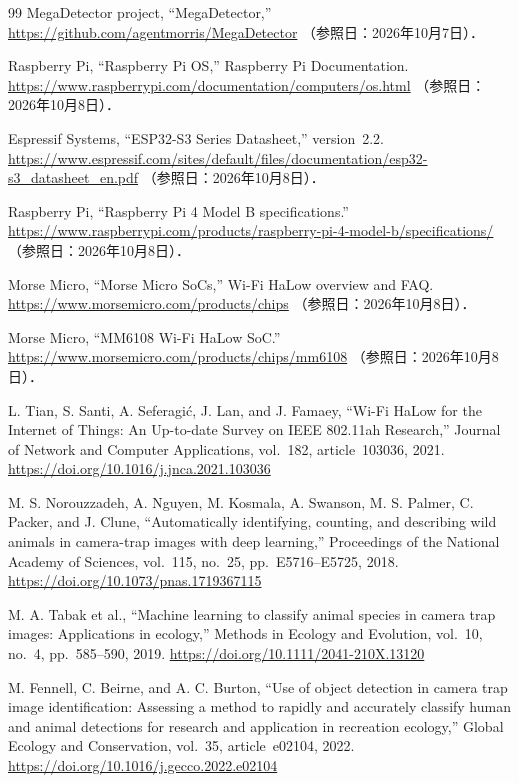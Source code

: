 \begin{thebibliography}{99}
  MegaDetector project, ``MegaDetector,''
  \url{https://github.com/agentmorris/MegaDetector}
  （参照日：2026年10月7日）．

  Raspberry Pi, ``Raspberry Pi OS,'' Raspberry Pi Documentation.
  \url{https://www.raspberrypi.com/documentation/computers/os.html}
  （参照日：2026年10月8日）．

  Espressif Systems, ``ESP32-S3 Series Datasheet,'' version~2.2.
  \url{https://www.espressif.com/sites/default/files/documentation/esp32-s3_datasheet_en.pdf}
  （参照日：2026年10月8日）．

  Raspberry Pi, ``Raspberry Pi 4 Model B specifications.''
  \url{https://www.raspberrypi.com/products/raspberry-pi-4-model-b/specifications/}
  （参照日：2026年10月8日）．

  Morse Micro, ``Morse Micro SoCs,'' Wi-Fi HaLow overview and FAQ.
  \url{https://www.morsemicro.com/products/chips}
  （参照日：2026年10月8日）．

  Morse Micro, ``MM6108 Wi-Fi HaLow SoC.''
  \url{https://www.morsemicro.com/products/chips/mm6108}
  （参照日：2026年10月8日）．

  L. Tian, S. Santi, A. Seferagi\'c, J. Lan, and J. Famaey,
  ``Wi-Fi HaLow for the Internet of Things: An Up-to-date Survey on IEEE 802.11ah Research,''
  Journal of Network and Computer Applications, vol.~182, article~103036, 2021.
  \url{https://doi.org/10.1016/j.jnca.2021.103036}

  M. S. Norouzzadeh, A. Nguyen, M. Kosmala, A. Swanson, M. S. Palmer, C. Packer, and J. Clune,
  ``Automatically identifying, counting, and describing wild animals in camera-trap images with deep learning,''
  Proceedings of the National Academy of Sciences, vol.~115, no.~25,
  pp.~E5716--E5725, 2018.
  \url{https://doi.org/10.1073/pnas.1719367115}

  M. A. Tabak et al.,
  ``Machine learning to classify animal species in camera trap images: Applications in ecology,''
  Methods in Ecology and Evolution, vol.~10, no.~4, pp.~585--590, 2019.
  \url{https://doi.org/10.1111/2041-210X.13120}

  M. Fennell, C. Beirne, and A. C. Burton,
  ``Use of object detection in camera trap image identification: Assessing a method to rapidly and accurately classify human and animal detections for research and application in recreation ecology,''
  Global Ecology and Conservation, vol.~35, article~e02104, 2022.
  \url{https://doi.org/10.1016/j.gecco.2022.e02104}


\end{thebibliography}
